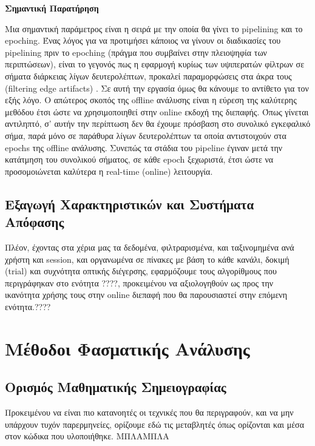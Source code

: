 \documentclass[11pt,a4paper,english,greek,twoside]{../Thesis}
\begin{document}
\textbf{Σημαντική Παρατήρηση}
\par Μια σημαντική παράμετρος είναι η σειρά με την οποία θα γίνει το pipelining και το epoching. Ένας λόγος για να προτιμήσει κάποιος να γίνουν οι διαδικασίες του pipelining πριν το epoching (πράγμα που συμβαίνει στην πλειοψηφία των περιπτώσεων), είναι το γεγονός πως η εφαρμογή κυρίως των υψιπερατών φίλτρων σε σήματα διάρκειας λίγων δευτερολέπτων, προκαλεί παραμορφώσεις στα άκρα τους (filtering edge artifacts) \cite{noauthor_undated-rl}\cite{Luck2014-mg}. Σε αυτή την εργασία όμως θα κάνουμε το αντίθετο για τον εξής λόγο. Ο απώτερος σκοπός της offline ανάλυσης είναι η εύρεση της καλύτερης μεθόδου έτσι ώστε να χρησιμοποιηθεί στην online εκδοχή της διεπαφής. Όπως γίνεται αντιληπτό, σ' αυτήν την περίπτωση δεν θα έχουμε πρόσβαση στο συνολικό εγκεφαλικό σήμα, παρά μόνο σε παράθυρα λίγων δευτερολέπτων τα οποία αντιστοιχούν στα epochs της offline ανάλυσης. Συνεπώς τα στάδια του pipeline έγιναν μετά την κατάτμηση του συνολικού σήματος, σε κάθε epoch ξεχωριστά, έτσι ώστε να προσομοιώνεται καλύτερα η real-time (online) λειτουργία.

\subsection{Εξαγωγή Χαρακτηριστικών και Συστήματα Απόφασης}
\label{subsec:featureExtract}
\par Πλέον, έχοντας στα χέρια μας τα δεδομένα, φιλτραρισμένα, και ταξινομημένα ανά χρήστη και session, και οργανωμένα σε πίνακες με βάση το κάθε κανάλι, δοκιμή (trial) και συχνότητα οπτικής διέγερσης, εφαρμόζουμε τους αλγορίθμους που περιγράφηκαν στο ενότητα ????, προκειμένου να αξιολογηθούν ως προς την ικανότητα χρήσης τους στην online διεπαφή που θα παρουσιαστεί στην επόμενη ενότητα.????

\section{Μέθοδοι Φασματικής Ανάλυσης}
\subsection{Ορισμός Μαθηματικής Σημειογραφίας}
\par Προκειμένου να είναι πιο κατανοητές οι τεχνικές που θα περιγραφούν, και να μην υπάρχουν τυχόν παρερμηνείες, ορίζουμε εδώ τις μεταβλητές όπως ορίζονται και μέσα στον κώδικα που υλοποιήθηκε. ΜΠΛΑΜΠΛΑ
\end{document}
